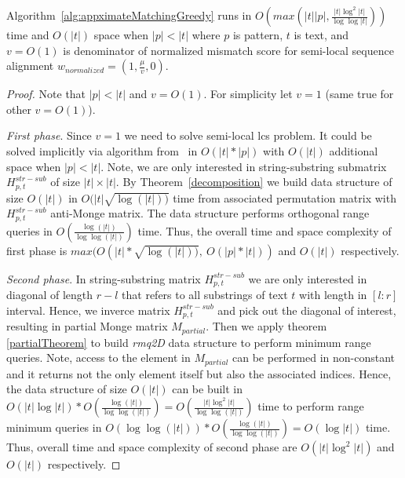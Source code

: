\begin{theorem}
Algorithm~\ref{alg:appximateMatchingGreedy} runs in $O(max(|t||p|,\frac{|t| \log^2 |t|}{\log \log |t|} ))$ time and $O(|t|)$ space when $|p|<|t|$ where $p$ is pattern, $t$ is text, and $v=O(1)$ is denominator of normalized mismatch score for semi-local sequence alignment $w_{normalized} = (1,\frac{\mu}{v},0)$.
\end{theorem}
\begin{proof}
Note that $|p|<|t|$ and $v=O(1)$.
For simplicity let $v=1$ (same true for other $v=O(1)$).

\emph{First phase}. 
Since $v=1$ we need to solve semi-local lcs problem.
It could be solved implicitly via algorithm from~\cite{.} in $O(|t| * |p|)$ with $O(|t|)$ additional space when $|p|<|t|$.
Note, we are only interested in string-substring submatrix $H^{str-sub}_{p,t}$ of size $|t| \times |t|$.
By Theorem~\ref{decomposition} we build data structure of size $O(|t|)$ in $O(|t|\sqrt{\log(|t|))}$ time from associated permutation matrix with $H^{str-sub}_{p,t}$ anti-Monge matrix.
The data structure performs orthogonal range queries in $O(\frac{\log (|t|)}{\log \log (|t|)})$ time.
Thus, the overall time and space complexity of first phase 
is $max(O(|t|*\sqrt{\log(|t|))},\ O(|p|*|t|))$ and
$O(|t|)$ respectively.

\emph{Second phase}.
In string-substring matrix $H^{str-sub}_{p,t}$ we are only interested in diagonal of length $r-l$ that refers to all substrings of text $t$ with length in $[l:r]$ interval. 
Hence, we inverce matrix  $H^{str-sub}_{p,t}$ and pick out the diagonal of interest, resulting in partial Monge matrix $M_{partial}$.
Then we apply theorem  \ref{partialTheorem} to build 
\emph{rmq2D} data structure to perform minimum range queries.
Note, access to the element in $M_{partial}$ can be performed in non-constant and it returns not the only element itself but also the associated indices.
Hence, the data structure of size $O(|t|)$ can be built in $O(|t| \log |t|)* O(\frac{\log (|t|)}{\log \log (|t|)}) = O(\frac{|t|\log^2 |t|}{\log \log (|t|)}) $ time to perform range minimum queries in $O(\log \log (|t|))*O(\frac{\log (|t|)}{\log \log (|t|)}) = O(\log |t|)$ time.
Thus, overall time and space complexity of second phase are $O(|t| \log^2 |t|)$ and $O(|t|)$ respectively.


\end{proof}
